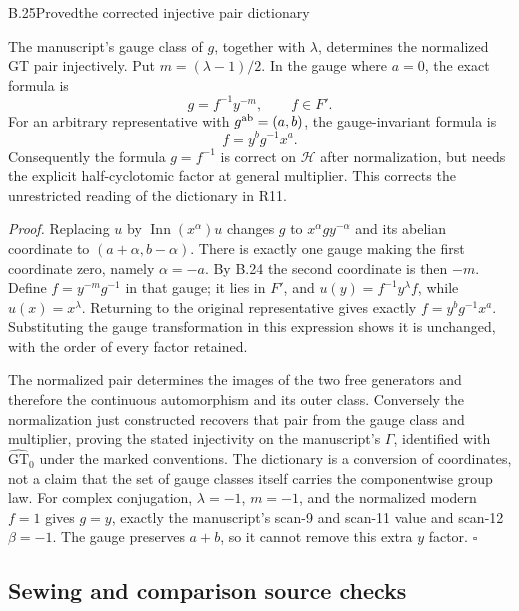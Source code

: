 \begin{statement}{B.25}{Proved}{the corrected injective pair dictionary}
\end{statement}
The manuscript's gauge class of $g$, together with $\lambda$,
determines the normalized GT pair injectively. Put
$m=(\lambda-1)/2$. In the gauge where $a=0$, the exact formula is
\[
                   g=f^{-1}y^{-m},\qquad f\in F'.
\]
For an arbitrary representative with $g^{\rm ab}=(a,b)$, the
gauge-invariant formula is
\[
                          f=y^b g^{-1}x^a.
\]
Consequently the formula $g=f^{-1}$ is correct on
$\mathcal H$ after normalization, but needs the explicit
half-cyclotomic factor at general multiplier. This corrects
the unrestricted reading of the dictionary in R11.

\emph{Proof.}
Replacing $u$ by $\operatorname{Inn}(x^\alpha)u$ changes $g$
to $x^\alpha gy^{-\alpha}$ and its abelian coordinate to
$(a+\alpha,b-\alpha)$. There is exactly one gauge making
the first coordinate zero, namely $\alpha=-a$. By B.24 the
second coordinate is then $-m$. Define $f=y^{-m}g^{-1}$
in that gauge; it lies in $F'$, and
$u(y)=f^{-1}y^\lambda f$, while $u(x)=x^\lambda$.
Returning to the original representative gives exactly
$f=y^b g^{-1}x^a$. Substituting the gauge transformation
in this expression shows it is unchanged, with the order
of every factor retained.

The normalized pair determines the images of the two free
generators and therefore the continuous automorphism and its
outer class. Conversely the normalization just constructed
recovers that pair from the gauge class and multiplier, proving
the stated injectivity on the manuscript's $\Gamma$, identified
with $\widehat{\mathrm{GT}}_0$ under the marked conventions.
The dictionary is a conversion of coordinates, not a claim
that the set of gauge classes itself carries the componentwise
group law. For complex conjugation, $\lambda=-1$, $m=-1$,
and the normalized modern $f=1$ gives $g=y$, exactly the
manuscript's scan-9 and scan-11 value and scan-12 $\beta=-1$.
The gauge preserves $a+b$, so it cannot remove this extra
$y$ factor. \hfill$\square$

\subsection{Sewing and comparison source checks}


